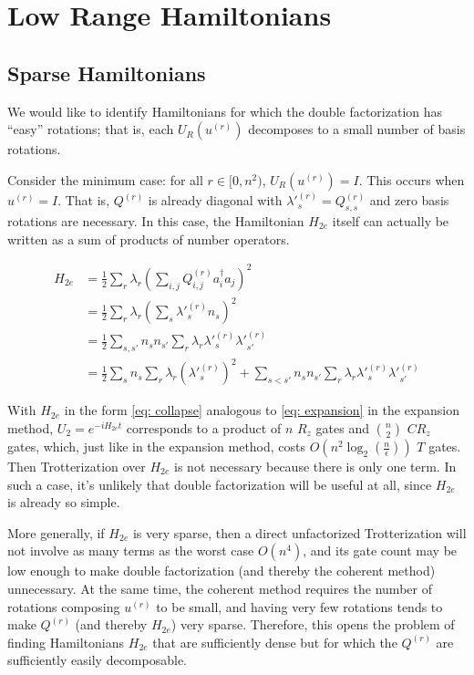 

\chapter{Low Range Hamiltonians}

\section{Sparse Hamiltonians}

We would like to identify Hamiltonians for which the double factorization has ``easy'' rotations; that is, each $U_R(u^{(r)})$ decomposes to a small number of basis rotations.

Consider the minimum case: for all $r \in [0, n^2)$, $U_R(u^{(r)}) = I$. This occurs when $u^{(r)} = I$. That is, $Q^{(r)}$ is already diagonal with $\lambda'^{(r)}_s = Q^{(r)}_{s, s}$ and zero basis rotations are necessary. In this case, the Hamiltonian $H_{2e}$ itself can actually be written as a sum of products of number operators. 

\begin{equation}
    \begin{split}
        H_{2e} &= \frac{1}{2}\sum_r\lambda_r\left(\sum_{i,j} Q^{(r)}_{i, j}a^\dag_ia_j\right)^2 \\
        &= \frac{1}{2}\sum_r\lambda_r(\sum_{s} \lambda'^{(r)}_sn_s)^2 \\
        &= \frac{1}{2}\sum_{s, s'} n_sn_{s'}\sum_r\lambda_r\lambda'^{(r)}_s\lambda'^{(r)}_{s'} \\
        &= \frac{1}{2}\sum_s n_s\sum_r\lambda_r(\lambda'^{(r)}_s)^2 + \sum_{s < s'} n_sn_{s'}\sum_r\lambda_r\lambda'^{(r)}_s\lambda'^{(r)}_{s'} \label{eq: collapse}
    \end{split}
\end{equation}

With $H_{2e}$ in the form \eqref{eq: collapse} analogous to \eqref{eq: expansion} in the expansion method, $U_2 = e^{-iH_{2e}t}$ corresponds to a product of $n$ $R_z$ gates and ${n \choose 2}$ $CR_z$ gates, which, just like in the expansion method, costs $O(n^2\log_2(\frac{n}{\epsilon}))$ $T$ gates. Then Trotterization over $H_{2e}$ is not necessary because there is only one term. In such a case, it's unlikely that double factorization will be useful at all, since $H_{2e}$ is already so simple.

More generally, if $H_{2e}$ is very sparse, then a direct unfactorized Trotterization will not involve as many terms as the worst case $O(n^4)$, and its gate count may be low enough to make double factorization (and thereby the coherent method) unnecessary. At the same time, the coherent method requires the number of rotations composing $u^{(r)}$ to be small, and having very few rotations tends to make $Q^{(r)}$ (and thereby $H_{2e}$) very sparse. Therefore, this opens the problem of finding Hamiltonians $H_{2e}$ that are sufficiently dense but for which the $Q^{(r)}$ are sufficiently easily decomposable.

